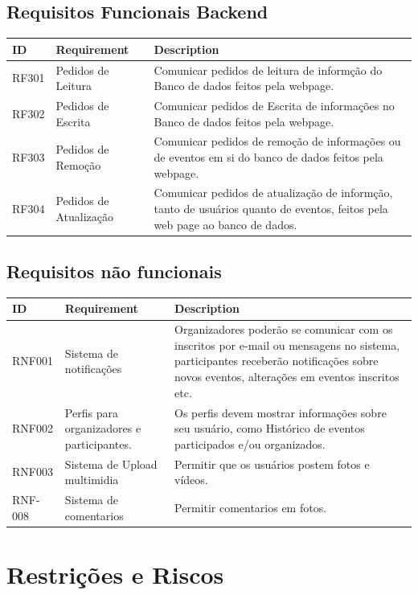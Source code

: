 \section{Requisitos Funcionais Backend}

\begin{tabular}{>{\raggedright}p{1.5cm}>{\raggedright}p{4cm}>{\raggedright}p{10cm}}
\toprule
\textbf{ID} & \textbf{Requirement} & \textbf{Description} \tabularnewline 
\midrule
  RF301 & Pedidos de Leitura & Comunicar pedidos de leitura de informção do Banco de dados feitos pela webpage. \tabularnewline \hline
  RF302 & Pedidos de Escrita & Comunicar pedidos de Escrita de informações no Banco de dados feitos pela webpage.\tabularnewline \hline
  RF303 & Pedidos de Remoção & Comunicar pedidos de remoção de informações ou de eventos em si do banco de dados feitos pela webpage.\tabularnewline \hline
  RF304 & Pedidos de Atualização & Comunicar pedidos de atualização de informção, tanto de usuários quanto de eventos, feitos pela web page ao banco de dados.\tabularnewline 
\bottomrule
\end{tabular}


\section{Requisitos não funcionais}
\begin{tabular}{>{\raggedright}p{1.5cm}>{\raggedright}p{4cm}>{\raggedright}p{10cm}}
\toprule
\textbf{ID} & \textbf{Requirement} & \textbf{Description} \tabularnewline 
\midrule
RNF001 & Sistema de notificações & Organizadores poderão se comunicar com os inscritos por e-mail ou mensagens no sistema, participantes receberão notiﬁcações sobre novos eventos, alterações em eventos inscritos etc. \tabularnewline \hline
RNF002 & Perﬁs para organizadores e participantes. & Os perfis devem mostrar informações sobre seu usuário, como Histórico de eventos participados e/ou organizados. \tabularnewline \hline
RNF003 & Sistema de Upload multimidia & Permitir que os usuários postem fotos e vídeos. \tabularnewline \hline 
RNF-008 & Sistema de comentarios & Permitir comentarios em fotos.\tabularnewline

\bottomrule
\end{tabular}


\chapter{Restrições e Riscos}

